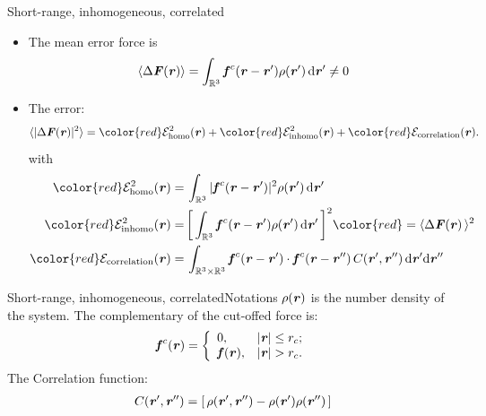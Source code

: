 \documentclass{beamer}
\newcommand{\redc}[1]{{\color{red} #1}}
\newcommand{\bluec}[1]{{\color{blue} #1}}
\renewcommand{\v}[1]{\textbf{\textit{#1}}}
\renewcommand{\d}[1]{\textrm{#1}}
\begin{document}
\begin{frame}{Short-range, inhomogeneous, correlated}
  \begin{itemize}\itemsep -10pt
  \item<1->   The mean error force is
  \bluec{
    \begin{align*}
      \langle\Delta\v F(\v r)\rangle
      =
      \int_{\mathbb R^3}\v f^c(\v r - \v r')\rho(\v r')\,\d d\v r'
      \neq 0
    \end{align*}
  }
  \vskip -10cm
\item<2->   The error:
  \bluec{
    \begin{align*} \nonumber
      \langle\vert\Delta\v F(\v r)\vert^2\rangle
      = 
      \redc{\mathcal E^2_{\textrm{homo}}(\v r)} +
      \redc{\mathcal E^2_{\textrm{inhomo}}(\v r)} +
      \redc{\mathcal E_{\textrm{correlation}}(\v r)}.
    \end{align*}
  }
  with\bluec{
  \begin{align*}
    \redc{\mathcal E^2_{\textrm{homo}}(\v r)}
    = &\,
    \int_{\mathbb R^3}\vert\v f^c(\v r - \v r')\vert^2\rho(\v r')\,\d d\v r'  \\
    \redc{\mathcal E^2_{\textrm{inhomo}}(\v r)}
    = &\,
    \bigg[\int_{\mathbb R^3}\v f^c(\v r - \v r')\rho(\v r')\,\d d\v r'\,\bigg]^2
    \redc{ = \langle\Delta\v F(\v r)\,\rangle^2}
    \\
    \redc{\mathcal E_{\textrm{correlation}}(\v r)}
    =&\,
    \int_{\mathbb R^3\times\mathbb R^3}\v f^c(\v r - \v r')\cdot\v f^c(\v r - \v r'')\,C(\v r', \v r'')\,\d d\v r'\d d\v r''
  \end{align*}}
  \end{itemize}
\end{frame}


\begin{frame}{Short-range, inhomogeneous, correlated}{Notations}
  \vfill
  \bluec{$\rho(\v r)$} is the number density of the system.
  \vfill  
  The complementary of the cut-offed force is:
  \bluec{
    \begin{align*}
      \v f^c(\v r) =
      \left\{
        \begin{array}{ll}
          0, & \vert\v r\vert\leq r_c; \\
          \v f(\v r), & \vert\v r\vert > r_c.
        \end{array}
      \right.
    \end{align*}}  
  \vfill  
  The Correlation function:
  \bluec{
    \begin{align*}
      C (\v r', \v r'') = [\,\rho(\v r', \v r'') -  \rho(\v r')\rho(\v r'')\,]
    \end{align*}}
  \vfill  
\end{frame}
\end{document}
